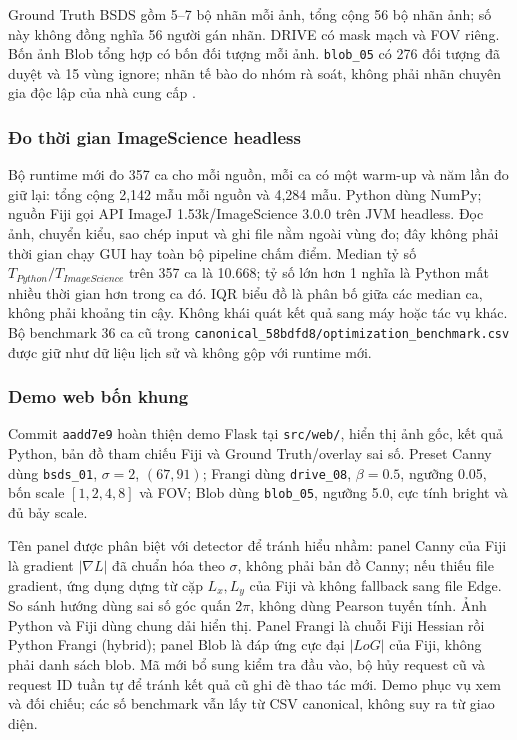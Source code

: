 Ground Truth BSDS gồm 5--7 bộ nhãn mỗi ảnh, tổng cộng 56 bộ nhãn ảnh; số này
không đồng nghĩa 56 người gán nhãn. DRIVE có mask mạch và FOV riêng. Bốn ảnh
Blob tổng hợp có bốn đối tượng mỗi ảnh. \texttt{blob\_05} có 276 đối tượng
đã duyệt và 15 vùng ignore; nhãn tế bào do nhóm rà soát, không phải nhãn
chuyên gia độc lập của nhà cung cấp \cite{xlaUpdate950,xlaRepository}.

\subsubsection{Đo thời gian ImageScience headless}
Bộ runtime mới đo 357 ca cho mỗi nguồn, mỗi ca có một warm-up và năm lần đo
giữ lại: tổng cộng 2,142 mẫu mỗi nguồn và 4,284 mẫu. Python dùng NumPy;
nguồn Fiji gọi API ImageJ 1.53k/ImageScience 3.0.0 trên JVM headless. Đọc ảnh,
chuyển kiểu, sao chép input và ghi file nằm ngoài vùng đo; đây không phải thời
gian chạy GUI hay toàn bộ pipeline chấm điểm. Median tỷ số
$T_{Python}/T_{ImageScience}$ trên 357 ca là 10.668; tỷ số lớn hơn 1 nghĩa là
Python mất nhiều thời gian hơn trong ca đó. IQR biểu đồ là phân bố giữa các
median ca, không phải khoảng tin cậy. Không khái quát kết quả sang máy hoặc
tác vụ khác. Bộ benchmark 36 ca cũ trong
\texttt{canonical\_58bdfd8/optimization\_benchmark.csv} được giữ như dữ liệu
lịch sử và không gộp với runtime mới.

\subsubsection{Demo web bốn khung}
Commit \texttt{aadd7e9} hoàn thiện demo Flask tại \texttt{src/web/}, hiển thị
ảnh gốc, kết quả Python, bản đồ tham chiếu Fiji và Ground Truth/overlay sai số.
Preset Canny dùng \texttt{bsds\_01}, $\sigma=2$, $(67,91)$; Frangi dùng
\texttt{drive\_08}, $\beta=0.5$, ngưỡng 0.05, bốn scale $[1,2,4,8]$ và FOV;
Blob dùng \texttt{blob\_05}, ngưỡng 5.0, cực tính bright và đủ bảy scale.

Tên panel được phân biệt với detector để tránh hiểu nhầm: panel Canny của Fiji
là gradient $|\nabla L|$ đã chuẩn hóa theo $\sigma$, không phải bản đồ Canny;
nếu thiếu file gradient, ứng dụng dựng từ cặp $L_x,L_y$ của Fiji và không
fallback sang file Edge. So sánh hướng dùng sai số góc quấn $2\pi$, không dùng
Pearson tuyến tính. Ảnh Python và Fiji dùng chung dải hiển thị. Panel Frangi
là chuỗi Fiji Hessian rồi Python Frangi (hybrid); panel Blob là đáp ứng cực
đại $|LoG|$ của Fiji, không phải danh sách blob. Mã mới bổ sung kiểm tra đầu
vào, bộ hủy request cũ và request ID tuần tự để tránh kết quả cũ ghi đè thao
tác mới. Demo phục vụ xem và đối chiếu; các số benchmark vẫn lấy từ CSV
canonical, không suy ra từ giao diện.

